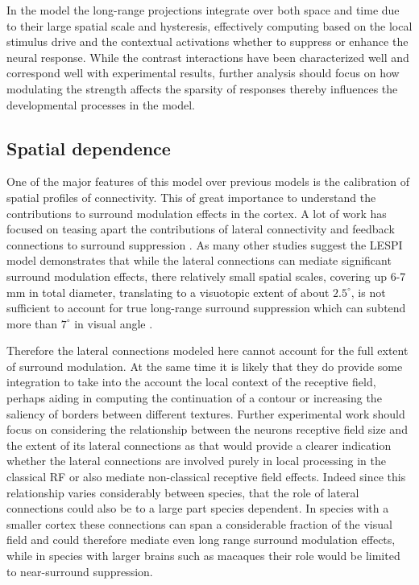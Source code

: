 In the model the long-range projections integrate over both space and
time due to their large spatial scale and hysteresis, effectively
computing based on the local stimulus drive and the contextual
activations whether to suppress or enhance the neural response. While
the contrast interactions have been characterized well and correspond
well with experimental results, further analysis should focus on how
modulating the strength affects the sparsity of responses thereby
influences the developmental processes in the model.

\subsection{Spatial dependence}

One of the major features of this model over previous models is the
calibration of spatial profiles of connectivity. This of great
importance to understand the contributions to surround modulation
effects in the cortex. A lot of work has focused on teasing apart the
contributions of lateral connectivity and feedback connections to
surround suppression \citep{Angelucci2002, Bair2003, Schwabe2006}. As
many other studies suggest the LESPI model demonstrates that while the
lateral connections can mediate significant surround modulation
effects, there relatively small spatial scales, covering up 6-7 mm in
total diameter, translating to a visuotopic extent of about
$2.5^\circ$, is not sufficient to account for true long-range surround
suppression which can subtend more than $7^\circ$ in visual angle
\citep{Bair2003, Levitt2002}.

Therefore the lateral connections modeled here cannot account for the
full extent of surround modulation. At the same time it is likely that
they do provide some integration to take into the account the local
context of the receptive field, perhaps aiding in computing the
continuation of a contour or increasing the saliency of borders
between different textures. Further experimental work should focus on
considering the relationship between the neurons receptive field size
and the extent of its lateral connections as that would provide a
clearer indication whether the lateral connections are involved purely
in local processing in the classical RF or also mediate non-classical
receptive field effects. Indeed since this relationship varies
considerably between species, that the role of lateral connections
could also be to a large part species dependent. In species with a
smaller cortex these connections can span a considerable fraction of
the visual field and could therefore mediate even long range surround
modulation effects, while in species with larger brains such as
macaques their role would be limited to near-surround suppression.

